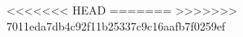 \documentclass[12pt]{article}
\begin{document}
%
<<<<<<< HEAD
=======
>>>>>>> 7011eda7db4c92f11b25337c9c16aafb7f0259ef
%
%
%
%
%
%
%
%
%
%
\end{document}
